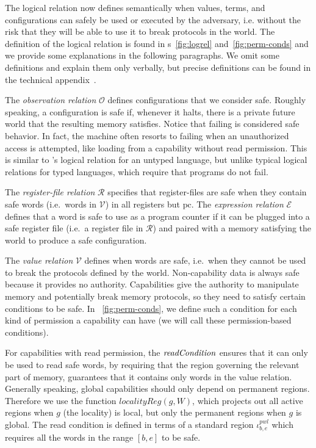 \documentclass[compsoc,conference,letterpaper,fleqn]{IEEEtran}
\newcommand\dominique[1]{{\color{purple} \sf \footnotesize {DD: #1}}\\}
\renewcommand\dominique[1]{}
\newcommand{\var}[1]{\mathit{#1}}
\newcommand{\gl}{\var{g}}
\newcommand{\pcreg}{\mathrm{pc}}
\newcommand{\start}{\var{b}}
\newcommand{\addrend}{\var{e}}
\newcommand{\pwl}{\var{pwl}}
\newcommand{\plainfun}[2]{
  \ifthenelse{\equal{#2}{}}
  {\mathit{#1}}
  {\mathit{#1}(#2)}
}
\newcommand{\readCond}[1]{\plainfun{readCondition}{#1}}
\newcommand{\asmType}{\plaindom{AsmType}}
\newcommand{\plaindom}[1]{\mathrm{#1}}
\newcommand{\intr}[2]{\mathcal{#1}}
\newcommand{\valueintr}[1]{\intr{V}{#1}}
\newcommand{\exprintr}[1]{\intr{E}{#1}}
\newcommand{\regintr}[1]{\intr{R}{#1}}
\newcommand{\stdvr}{\valueintr{\asmType}}
\newcommand{\stder}{\exprintr{\asmType}}
\newcommand{\stdrr}{\regintr{\asmType}}
\newcommand{\observations}{\mathcal{O}}
\begin{document}
The logical relation now defines semantically when values, terms, and
configurations can safely be used or executed by the adversary, i.e. without the
risk that they will be able to use it to break protocols in the world. The
definition of the logical relation is found in \figurename{}s~\ref{fig:logrel}
and~\ref{fig:perm-conds} and we provide some explanations in the following
paragraphs. We omit some definitions and explain them only verbally, but precise
definitions can be found in the technical appendix~\cite{technical_appendix}.

The \emph{observation relation} $\observations$ defines configurations that we
consider safe. Roughly speaking, a configuration is safe if, whenever it halts,
there is a private future world that the resulting memory satisfies. Notice that
failing is considered safe behavior. In fact, the machine often resorts to
failing when an unauthorized access is attempted, like loading from a capability
without read permission. This is similar to \cite{Devriese:2016ObjCap}'s logical
relation for an untyped language, but unlike typical logical relations
for typed languages, which require that programs do not fail.

The \emph{register-file relation} $\stdrr$ specifies that register-files are
safe when they contain safe words (i.e.\ words in $\stdvr$) in all registers but
$\pcreg$. The \emph{expression relation} $\stder$ defines that a word is safe to
use as a program counter if it can be plugged into a safe register file (i.e.\ a
register file in $\stdrr$) and paired with a memory satisfying the world to
produce a safe configuration.

The \emph{value relation} $\stdvr$ defines when words are safe, i.e.\ when they
cannot be used to break the protocols defined by the world. Non-capability data
is always safe because it provides no authority. Capabilities give the authority
to manipulate memory and potentially break memory protocols, so they need to
satisfy certain conditions to be safe. In \figurename~\ref{fig:perm-conds}, we
define such a condition for each kind of permission a capability can have (we
will call these permission-based conditions).

For capabilities with read permission, the $\readCond{}$ ensures that it can
only be used to read safe words, by requiring that the region governing the
relevant part of memory, guarantees that it contains only words in the value
relation. Generally speaking, global capabilities should only depend on
permanent regions. Therefore we use the function $\var{localityReg}(\gl,W)$,
which projects out all active regions when $\gl$ (the locality) is local, but
only the permanent regions when $\gl$ is global. The read condition is defined
in terms of a standard region $\iota^\pwl_{\start,\addrend}$ which requires all
the words in the range $[\start,\addrend]$ to be safe.
\end{document}
